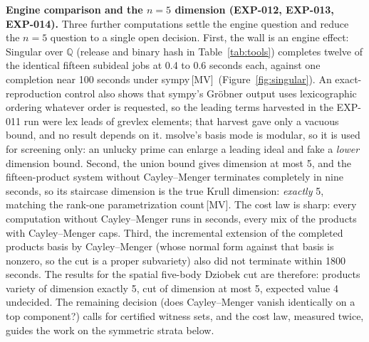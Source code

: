 \documentclass[11pt]{article}
\theoremstyle{definition}
\theoremstyle{remark}
\newcommand{\mk}[1]{\,{\scriptsize[#1]}}
\newcommand{\MV}{\mk{MV}}
\begin{document}
\medskip
\noindent\textbf{Engine comparison and the $n=5$ dimension (EXP-012, EXP-013,
EXP-014).} Three further computations settle the engine question and reduce the
$n=5$ question to a single open decision. First, the wall is an engine effect:
Singular over $\mathbb{Q}$ (release and binary hash in Table~\ref{tab:tools}) completes twelve of the identical fifteen subideal jobs at 0.4 to 0.6 seconds each, against one completion
near 100 seconds under sympy\MV\ (Figure~\ref{fig:singular}). An exact-reproduction control also shows that
sympy's Gr\"obner output uses lexicographic ordering whatever order is requested,
so the leading terms harvested in the EXP-011 run were lex leads of grevlex
elements; that harvest gave only a vacuous bound, and no result depends on it.
msolve's basis mode is modular, so it is used for screening only: an unlucky
prime can enlarge a leading ideal and fake a \emph{lower} dimension bound.
Second, the union bound gives dimension at most 5, and the fifteen-product
system without Cayley--Menger terminates completely in nine seconds, so its
staircase dimension is the true Krull dimension: \emph{exactly} 5, matching the
rank-one parametrization count\MV. The cost law is sharp: every computation
without Cayley--Menger runs in seconds, every mix of the products with
Cayley--Menger caps. Third, the incremental extension of the completed
products basis by Cayley--Menger (whose normal form against that basis is
nonzero, so the cut is a proper subvariety) also did not terminate within
1800 seconds. The results for the spatial five-body Dziobek cut
are therefore: products variety of dimension exactly 5, cut of dimension at
most 5, expected value 4 undecided. The remaining decision (does Cayley--Menger
vanish identically on a top component?) calls for certified witness sets, and
the cost law, measured twice, guides the work on the symmetric strata below.
\end{document}
